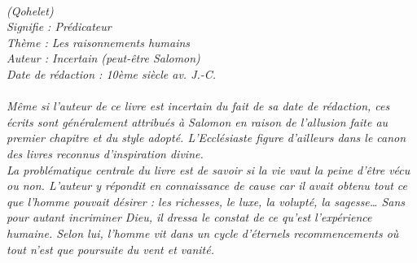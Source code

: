 \BFont
\noindent\hrulefill
{\footnotesize
\textit{
\bigskip
{\centering{}
\\(Qohelet)
\\Signifie : Prédicateur
\\Thème : Les raisonnements humains
\\Auteur : Incertain (peut-être Salomon)
\\Date de rédaction : 10ème siècle av. J.-C.\\}
}
\textit{
\\Même si  l’auteur de ce livre est incertain du fait de sa date de rédaction, ces écrits sont généralement attribués à Salomon en raison de l’allusion faite au premier chapitre et du style adopté. L’Ecclésiaste figure d’ailleurs dans le canon des livres reconnus d’inspiration divine.
\\La problématique centrale du livre est de savoir si la vie vaut la peine d’être vécu ou non. L’auteur y répondit en connaissance de cause car il avait obtenu tout ce que l’homme pouvait désirer : les richesses, le luxe, la volupté, la sagesse… Sans pour autant incriminer Dieu, il dressa le constat de ce qu’est l’expérience humaine. Selon lui, l’homme vit dans un cycle d’éternels recommencements où tout n’est que poursuite du vent et vanité. 
}
}
\par\nobreak\noindent\hrulefill
